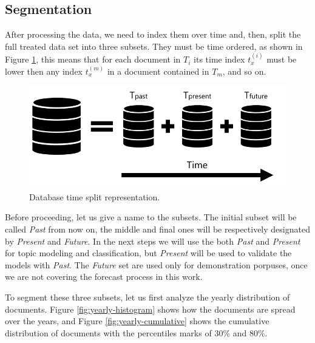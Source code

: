 \subsection{Segmentation}

After processing the data, we need to index them over time and, then, split the full treated data set into three subsets. They must be time ordered, as shown in Figure \ref{fig:database}, this means that for each document in $T_{i}$ its time index $t_{x}^{(i)}$ must be lower then any index $t_{x}^{(m)}$ in a document contained in $T_{m}$, and so on.

\begin{figure}[h!]
	\centering
	\includegraphics[width=0.65\linewidth]{01.Chapters/04.Materials/database}
	\caption{Database time split representation.}
	\label{fig:database}
\end{figure}

Before proceeding, let us give a name to the subsets. The initial subset will be called \textit{Past} from now on, the middle and final ones will be respectively designated by \textit{Present} and \textit{Future}. In the next steps we will use the both \textit{Past} and \textit{Present} for topic modeling and classification, but \textit{Present} will be used to validate the models with \textit{Past}. The \textit{Future} set are used only for demonstration porpuses, once we are not covering the forecast process in this work.

To segment these three subsets, let us first analyze the yearly distribution of documents. Figure \ref{fig:yearly-histogram} shows how the documents are spread over the years, and Figure \ref{fig:yearly-cumulative} shows the cumulative distribution of documents with the percentiles marks of 30\% and 80\%.

